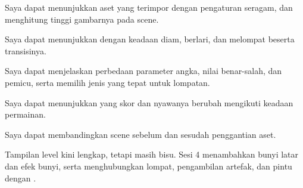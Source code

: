 
\begin{checklistbox}
\begin{checklist}
  \item Saya dapat menunjukkan aset  yang terimpor dengan
        pengaturan seragam, dan menghitung tinggi gambarnya pada scene.
  \item Saya dapat menunjukkan  dengan keadaan diam,
        berlari, dan melompat beserta transisinya.
  \item Saya dapat menjelaskan perbedaan parameter angka, nilai benar-salah,
        dan pemicu, serta memilih jenis yang tepat untuk lompatan.
  \item Saya dapat menunjukkan  yang skor dan nyawanya
        berubah mengikuti keadaan permainan.
  \item Saya dapat membandingkan scene sebelum dan sesudah penggantian aset.
\end{checklist}
\end{checklistbox}


Tampilan level kini lengkap, tetapi masih bisu. Sesi 4 menambahkan bunyi latar
dan efek bunyi, serta menghubungkan lompat, pengambilan artefak, dan pintu
dengan .
